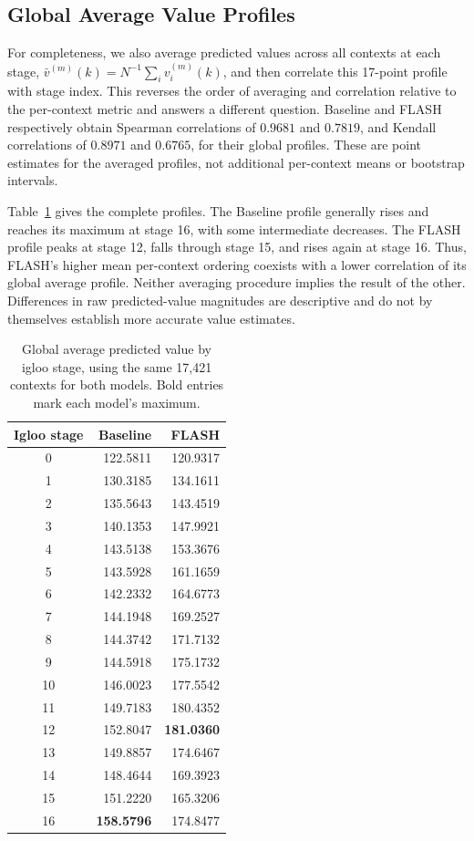 \documentclass{article} %
\begin{document}
\subsection{Global Average Value Profiles}
For completeness, we also average predicted values across all contexts at each stage, $\bar v^{(m)}(k)=N^{-1}\sum_i v_i^{(m)}(k)$, and then correlate this 17-point profile with stage index. This reverses the order of averaging and correlation relative to the per-context metric and answers a different question. Baseline and FLASH respectively obtain Spearman correlations of $0.9681$ and $0.7819$, and Kendall correlations of $0.8971$ and $0.6765$, for their global profiles. These are point estimates for the averaged profiles, not additional per-context means or bootstrap intervals.

Table~\ref{tab:global_average_values} gives the complete profiles. The Baseline profile generally rises and reaches its maximum at stage 16, with some intermediate decreases. The FLASH profile peaks at stage 12, falls through stage 15, and rises again at stage 16. Thus, FLASH's higher mean per-context ordering coexists with a lower correlation of its global average profile. Neither averaging procedure implies the result of the other. Differences in raw predicted-value magnitudes are descriptive and do not by themselves establish more accurate value estimates.

\begin{table}[!t]
\centering
\small
\caption{Global average predicted value by igloo stage, using the same 17,421 contexts for both models. Bold entries mark each model's maximum.}
\label{tab:global_average_values}
\begin{tabular}{crr}
\toprule
Igloo stage & Baseline & FLASH \\
\midrule
0 & 122.5811 & 120.9317 \\
1 & 130.3185 & 134.1611 \\
2 & 135.5643 & 143.4519 \\
3 & 140.1353 & 147.9921 \\
4 & 143.5138 & 153.3676 \\
5 & 143.5928 & 161.1659 \\
6 & 142.2332 & 164.6773 \\
7 & 144.1948 & 169.2527 \\
8 & 144.3742 & 171.7132 \\
9 & 144.5918 & 175.1732 \\
10 & 146.0023 & 177.5542 \\
11 & 149.7183 & 180.4352 \\
12 & 152.8047 & \textbf{181.0360} \\
13 & 149.8857 & 174.6467 \\
14 & 148.4644 & 169.3923 \\
15 & 151.2220 & 165.3206 \\
16 & \textbf{158.5796} & 174.8477 \\
\bottomrule
\end{tabular}
\end{table}
\end{document}
